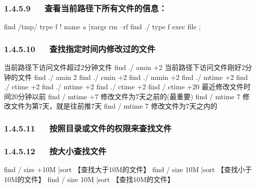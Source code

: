 \documentclass[letterpaper,12pt,english]{sphinxmanual}
\begin{document}
\subsubsection{1.4.5.9   查看当前路径下所有文件的信息：}
\label{\detokenize{001software/001install/linux:id13}}
\begin{sphinxVerbatim}[commandchars=\\\{\}]
find /tmp/ \PYGZhy{}type f ! \PYGZhy{}name a |xargs rm –rf
find ./ \PYGZhy{}type f \PYGZhy{}exec file \PYGZob{}\PYGZcb{} \PYGZbs{};
\end{sphinxVerbatim}


\subsubsection{1.4.5.10   查找指定时间内修改过的文件}
\label{\detokenize{001software/001install/linux:id14}}
\begin{sphinxVerbatim}[commandchars=\\\{\}]
\PYGZsh{} 当前路径下访问文件超过2分钟文件
find ./ \PYGZhy{}amin +2
\PYGZsh{} 当前路径下访问文件刚好2分钟的文件
find ./ \PYGZhy{}amin 2
find ./ \PYGZhy{}cmin +2
find ./ \PYGZhy{}mmin +2
find ./ \PYGZhy{}mtime +2
find ./ \PYGZhy{}ctime +2
find ./ \PYGZhy{}mtime +2
find ./ \PYGZhy{}ctime +2
find / \PYGZhy{}ctime  +20  最近修改文件时间20分钟以前
find / \PYGZhy{}mtime  +7   修改文件为7天之前的(最重要)
find / \PYGZhy{}mtime  7    修改文件为第7天，就是往前推7天
find / \PYGZhy{}mtime  \PYGZhy{}7   修改文件为7天之内的
\end{sphinxVerbatim}


\subsubsection{1.4.5.11   按照目录或文件的权限来查找文件}
\label{\detokenize{001software/001install/linux:id15}}
\begin{sphinxVerbatim}[commandchars=\\\{\}]
   
\end{sphinxVerbatim}


\subsubsection{1.4.5.12   按大小查找文件}
\label{\detokenize{001software/001install/linux:id16}}
\begin{sphinxVerbatim}[commandchars=\\\{\}]
find / \PYGZhy{}size +10M  |sort 【查找大于10M的文件】
find / \PYGZhy{}size \PYGZhy{}10M  |sort 【查找小于10M的文件】
find / \PYGZhy{}size 10M   |sort  【查找10M的文件】
\end{sphinxVerbatim}
\end{document}
